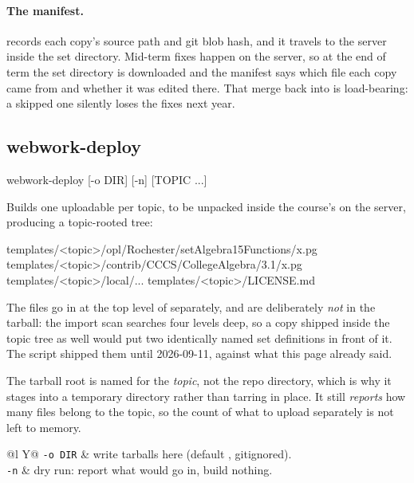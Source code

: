 \paragraph{The manifest.}
 records each copy's source path and git blob hash, and it travels to the server inside the set directory.
Mid-term fixes happen on the server, so at the end of term the set directory is downloaded and the manifest says which file each copy came from and whether it was edited there.
That merge back into  is load-bearing: a skipped one silently loses the fixes next year.

\subsection*{webwork-deploy}

\begin{manexsource}
webwork-deploy [-o DIR] [-n] [TOPIC ...]
\end{manexsource}

Builds one uploadable  per topic, to be unpacked inside the
course's  on the server, producing a topic-rooted tree:

\begin{manexsource}
templates/<topic>/opl/Rochester/setAlgebra15Functions/x.pg
templates/<topic>/contrib/CCCS/CollegeAlgebra/3.1/x.pg
templates/<topic>/local/...
templates/<topic>/LICENSE.md
\end{manexsource}

The  files go in at the top level of 
separately, and are deliberately \emph{not} in the tarball: the import scan
searches  four levels deep, so a copy shipped inside the
topic tree as well would put two identically named set definitions in front
of it. The script shipped them until 2026-09-11, against what this page
already said.

The tarball root is named for the \emph{topic}, not the repo directory, which
is why it stages into a temporary directory rather than tarring in place.
It still \emph{reports} how many  files belong to the topic, so the
count of what to upload separately is not left to memory.

\begin{center}
\begin{tabularx}{\linewidth}{@{}l Y@{}}
\texttt{-o DIR} & write tarballs here (default , gitignored).\\
\texttt{-n} & dry run: report what would go in, build nothing.\\
\end{tabularx}
\end{center}


